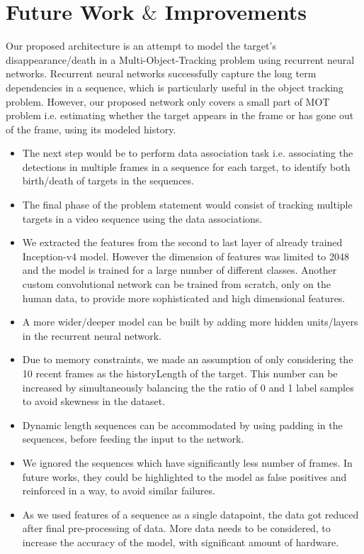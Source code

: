\documentclass[journal]{IEEEtran}
\begin{document}
\section{Future Work $\&$ Improvements}
Our proposed architecture is an attempt to model the target's disappearance/death in a Multi-Object-Tracking problem using recurrent neural networks. Recurrent neural networks successfully capture the long term dependencies in a sequence, which is particularly useful in the object tracking problem. However, our proposed network only covers a small part of MOT problem i.e. estimating whether the target appears in the frame or has gone out of the frame, using its modeled history.
\begin{itemize}
    \item The next step would be to perform data association task i.e. associating the detections in multiple frames in a sequence for each target, to identify both birth/death of targets in the sequences.
    \item The final phase of the problem statement would consist of tracking multiple targets in a video sequence using the data associations.
    \item We extracted the features from the second to last layer of already trained Inception-v4 model. However the dimension of features was limited to 2048 and the model is trained for a large number of different classes. Another custom convolutional network can be trained from scratch, only on the human data, to provide more sophisticated and high dimensional features.
    \item A more wider/deeper model can be built by adding more hidden units/layers in the recurrent neural network.
    \item Due to memory constraints, we made an assumption of only considering the 10 recent frames as the historyLength of the target. This number can be increased by simultaneously balancing the the ratio of 0 and 1 label samples to avoid skewness in the dataset.
    \item Dynamic length sequences can be accommodated by using padding in the sequences, before feeding the input to the network.
    \item We ignored the sequences which have significantly less number of frames. In future works, they could be highlighted to the model as false positives and reinforced in a way, to avoid similar failures. 
    \item As we used features of a sequence as a single datapoint, the data got reduced after final pre-processing of data. More data needs to be considered, to increase the accuracy of the model, with significant amount of hardware.
\end{itemize}
\end{document}
